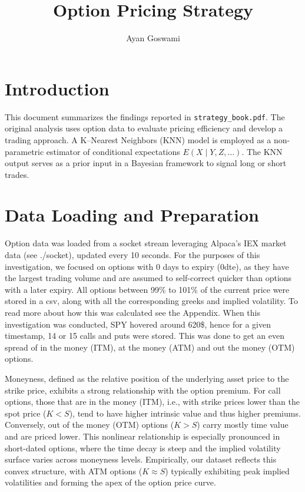 \documentclass{article}
\title{Option Pricing Strategy}
\author{Ayan Goswami}
\date{}
\begin{document}
\maketitle
\section{Introduction}

This document summarizes the findings reported in \texttt{strategy\_book.pdf}. The original analysis uses option data to evaluate pricing efficiency and develop a trading approach. A K--Nearest Neighbors (KNN) model is employed as a non-parametric estimator of conditional expectations $E(X\mid Y,Z,\ldots)$. The KNN output serves as a prior input in a Bayesian framework to signal long or short trades.

\section{Data Loading and Preparation}

Option data was loaded from a socket stream leveraging Alpaca's IEX market data (see ./socket), updated every 10 seconds. For the purposes of this investigation, we focused on options with 0 days to expiry (0dte), as they have the largest trading volume and are assumed to self-correct quicker than options with a later expiry. All options between 99\% to 101\% of the current price were stored in a csv, along with all the corresponding greeks and implied volatility. To read more about how this was calculated see the Appendix. When this investigation was conducted, SPY hovered around 620\$, hence for a given timestamp, 14 or 15 calls and puts were stored. This was done to get an even spread of in the money (ITM), at the money (ATM) and out the money (OTM) options.

Moneyness, defined as the relative position of the underlying asset price to the strike price, exhibits a strong relationship with the option premium. For call options, those that are in the money (ITM), i.e., with strike prices lower than the spot price (\(K < S\)), tend to have higher intrinsic value and thus higher premiums. Conversely, out of the money (OTM) options (\(K > S\)) carry mostly time value and are priced lower. This nonlinear relationship is especially pronounced in short-dated options, where the time decay is steep and the implied volatility surface varies across moneyness levels. Empirically, our dataset reflects this convex structure, with ATM options (\(K \approx S\)) typically exhibiting peak implied volatilities and forming the apex of the option price curve.
\end{document}
